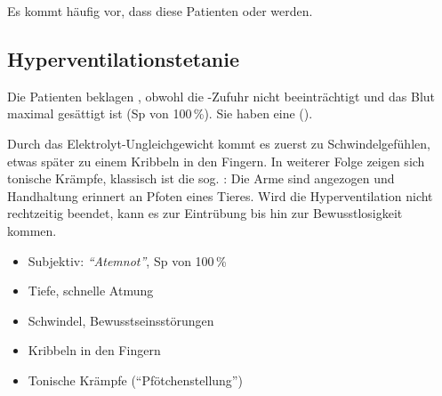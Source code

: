Es kommt häufig vor, dass diese Patienten  oder 
 werden. 




\subsection{Hyperventilationstetanie}
\label{topic:hyperventilationstetanie}




{
Die Patienten beklagen , obwohl die -Zufuhr nicht
beeinträchtigt und das Blut maximal gesättigt ist (Sp von 100\,\%). Sie
haben eine  ().

Durch das Elektrolyt-Ungleichgewicht kommt es zuerst zu Schwindelgefühlen, etwas
später zu einem Kribbeln in den Fingern. In weiterer Folge zeigen sich tonische
Krämpfe, klassisch ist die sog. :
Die Arme sind angezogen und Handhaltung erinnert an Pfoten eines Tieres. Wird
die Hyperventilation nicht rechtzeitig beendet, kann es zur
Eintrübung bis hin zur Bewusstlosigkeit kommen.

}{
\begin{itemize}
  \item Subjektiv: \emph{"`Atemnot"'}, Sp von 100\,\%
  \item Tiefe, schnelle Atmung
  \item Schwindel, Bewusstseinsstörungen
  \item Kribbeln in den Fingern
  \item Tonische Krämpfe ("`Pfötchenstellung"')
\end{itemize}
}{}{}{}

